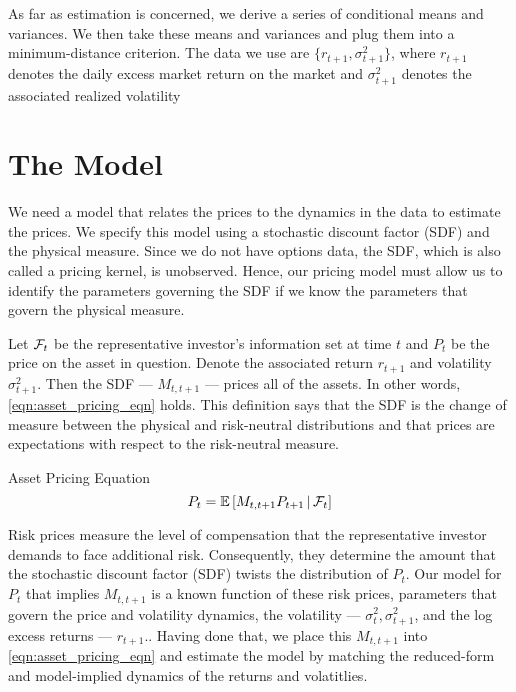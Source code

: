 \documentclass[11pt, letterpaper, twoside]{article}
\begin{document}
As far as estimation is concerned, we derive a series of conditional means and variances. We then take these means and variances and plug them into a minimum-distance  criterion. The data we use are $\lbrace r_{t+1}, \sigma^2_{t+1} \rbrace$, where $r_{t+1}$ denotes the daily excess market return on the market and $\sigma^2_{t+1}$ denotes the associated realized volatility 

\section{The Model}\label{sec:model}

\addtocounter{subsection}{1}

We need a model that relates the prices to the dynamics in the data to estimate the prices. We specify this model using a stochastic discount factor (SDF) and the physical measure. Since we do not have options data, the SDF, which is also called a pricing kernel, is unobserved. Hence, our pricing model must allow us to identify the parameters governing the SDF if we know the parameters that govern the physical measure. 

Let $\mathcal{F}_t$ be the representative investor's information set at time $t$ and $P_t$ be the price on the asset in question. Denote the associated return $r_{t+1}$ and volatility $\sigma^2_{t+1}$. Then the SDF --- $M_{t,t+1}$ --- prices all of the assets. In other words, \cref{eqn:asset_pricing_eqn} holds. This definition says that the SDF is the change of measure between the physical and risk-neutral distributions and that prices are expectations with respect to the risk-neutral measure.

\begin{defn}{Asset Pricing Equation}
  \label{eqn:asset_pricing_eqn}
  \begin{equation}
    P_t = \operatorname{\mathbb{E}}\left[M_{t,t+1} P_{t+1} \,\middle\vert\, \mathcal{F}_t \right] 
  \end{equation}
\end{defn}

Risk prices measure the level of compensation that the representative investor demands to face additional risk. Consequently, they determine the amount that the stochastic discount factor (SDF) twists the distribution of $P_t$. Our model for $P_t$ that implies $M_{t,t+1}$ is a known function of these risk prices, parameters that govern the price and volatility dynamics, the volatility --- $\sigma^2_{t}, \sigma^2_{t+1}$, and the log excess returns --- $r_{t+1}$.. Having done that, we place this $M_{t,t+1}$ into \cref{eqn:asset_pricing_eqn} and estimate the model by matching the reduced-form and model-implied dynamics of the returns and volatitlies.
\end{document}
